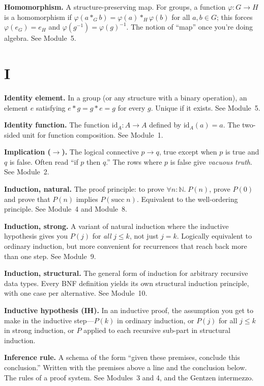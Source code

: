 \documentclass[11pt]{article}
\begin{document}
\textbf{Homomorphism.} A structure-preserving map. For groups, a function $\varphi : G \to H$ is a homomorphism if $\varphi(a *_G b) = \varphi(a) *_H \varphi(b)$ for all $a, b \in G$; this forces $\varphi(e_G) = e_H$ and $\varphi(g^{-1}) = \varphi(g)^{-1}$. The notion of ``map'' once you're doing algebra. See Module~5.

\section*{I}

\textbf{Identity element.} In a group (or any structure with a binary operation), an element $e$ satisfying $e * g = g * e = g$ for every $g$. Unique if it exists. See Module~5.

\textbf{Identity function.} The function $\mathrm{id}_A : A \to A$ defined by $\mathrm{id}_A(a) = a$. The two-sided unit for function composition. See Module~1.

\textbf{Implication ($\to$).} The logical connective $p \to q$, true except when $p$ is true and $q$ is false. Often read ``if $p$ then $q$.'' The rows where $p$ is false give \emph{vacuous truth}. See Module~2.

\textbf{Induction, natural.} The proof principle: to prove $\forall n : \mathbb{N}.\; P(n)$, prove $P(0)$ and prove that $P(n)$ implies $P(\text{succ}\; n)$. Equivalent to the well-ordering principle. See Module~4 and Module~8.

\textbf{Induction, strong.} A variant of natural induction where the inductive hypothesis gives you $P(j)$ for \emph{all} $j \leq k$, not just $j = k$. Logically equivalent to ordinary induction, but more convenient for recurrences that reach back more than one step. See Module~9.

\textbf{Induction, structural.} The general form of induction for arbitrary recursive data types. Every BNF definition yields its own structural induction principle, with one case per alternative. See Module~10.

\textbf{Inductive hypothesis (IH).} In an inductive proof, the assumption you get to make in the inductive step---$P(k)$ in ordinary induction, or $P(j)$ for all $j \leq k$ in strong induction, or $P$ applied to each recursive sub-part in structural induction.

\textbf{Inference rule.} A schema of the form ``given these premises, conclude this conclusion.'' Written with the premises above a line and the conclusion below. The rules of a proof system. See Modules~3 and 4, and the Gentzen intermezzo.
\end{document}
